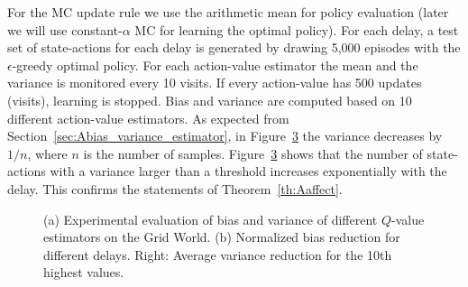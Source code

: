 \documentclass{article}
\newcommand{\figpath}{figures/}
\begin{document}
\begin{appendices}
For the MC update rule we use the arithmetic mean for policy evaluation
(later we will use constant-$\alpha$ MC for learning the optimal policy).
For each delay, a test set of state-actions for each delay is generated 
by drawing 5,000 episodes with the $\epsilon$-greedy optimal policy. 
For each action-value estimator the mean and the variance 
is monitored every 10 visits. If every action-value has 500 updates (visits), 
learning is stopped. Bias and variance are computed based on 10 different 
action-value estimators.
As expected from Section~\ref{sec:Abias_variance_estimator}, in Figure~\ref{fig:A_MCvar}
the variance decreases by $1/n$, where $n$ is the number of samples.
Figure~\ref{fig:A_MCvar} shows that the number of state-actions with a variance larger than a threshold 
increases exponentially with the delay.
This confirms the statements of Theorem~\ref{th:Aaffect}. 

\begin{figure}[htp]
 \centering
 \begin{subfigure}{.49\textwidth}
  \centering {}\caption{\label{fig:A_TDbias}}
 \end{subfigure}
 \begin{subfigure}{.49\textwidth}
  \centering {}\caption{\label{fig:A_MCvar}}
 \end{subfigure}\caption{(a) Experimental evaluation of bias and variance of
          different $Q$-value estimators on the Grid World.
          (b) Normalized bias reduction for different delays.
          Right: Average variance reduction for the 10th highest values.
          }
          
\end{figure}




\end{appendices}
\end{document}
